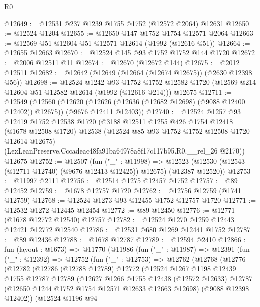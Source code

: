 \begin{lexlean}{R0}
\begin{coremodule}
@12649 := @12531 @237 @1239 @1755 @1752 (@12572 @2064) @12631
@12650 := @12524 @1204
@12655 := @12650 @147 @1752 @1754 @12571 @2064
@12663 := @12569 @51 @12604 @51 @12571 @12614 (@1992 (@12616 @51))
@12664 := @12655 @12663
@12670 := @12524 @145 @93 @1752 @1752 @144 @1720
@12672 := @2006 @12511 @11
@12674 := @12670 (@12672 @144)
@12675 := @2012 @12511
@12682 := @12642 (@12649 (@12664 (@12674 @12675)) (@2630 @12398 @56))
@12698 := @12524
    @1242
    @93
    @1752
    @1752
    @12582
    @1720
    (@12569 @214 @12604 @51 @12582 @12614 (@1992 (@12616 @214)))
    @12675
@12711 := @12549
    (@12560
      (@12620 (@12626 (@12636 (@12682 @12698) (@9088 @12400 @12402)) @12675))
      (@9676 @12411 @12403))
@12740 := @12524
    @1257
    @93
    @12419
    @1752
    @12538
    @1720
    (@3188
      @12511
      @1255
      @426
      @1754
      @12418
      (@1678 @12508 @1720)
      @12538
      (@12524 @85 @93 @1752 @1752 @12508 @1720 @12614 @12675)
      (LexLeanPreserve.Cccadeac48fa91ba64978a8f17c117b95.R0.__rel_26 @2170))
    @12675
@12752 := @12507
    (fun ("_" : @11998) =>
    @12523 (@12530 (@12543 (@12711 @12740) (@9676 @12413 @12425)) @12675) (@12387 @12520))
@12753 := @11997 @2111
@12756 := @12514 @1275 @12457 @1752
@12757 := @89 @12452
@12759 := @1678 @12757 @1720
@12762 := @12756 @12759 (@1741 @12759)
@12768 := @12524 @1273 @93 @12455 @1752 @12757 @1720
@12771 := @12532 @1272 @12445 @12454
@12772 := @89 @12450
@12776 := @12771 (@1678 @12772 @12540) @12757
@12782 := @12524 @1270 @1259 @12443 @12421 @12772 @12540
@12786 := @12531 @680 @1269 @12441 @1752
@12787 := @89 @12436
@12788 := @1678 @12787
@12789 := @12594 @2410
@12866 := fun (layout : @1673) =>
  @11770
    (@11986
      (fun ("_" : @11987) =>
      @12391
        (fun ("_" : @12392) =>
        @12752
          (fun ("_" : @12753) =>
          @12762
            (@12768
              (@12776
                (@12782
                  (@12786
                    (@12788 @12789)
                    @12772
                    (@12524
                      @1267
                      @1198
                      @12439
                      @1755
                      @12787
                      @12789
                      (@12627
                        @1266
                        @1755
                        @12438
                        (@12572 @12633)
                        @12787
                        (@12650 @1244 @1752 @1754 @12571 @12633 @12663 @12698)
                        (@9088 @12398 @12402))
                      (@12524
                        @1196
                        @94

\end{coremodule}
\end{lexlean}
